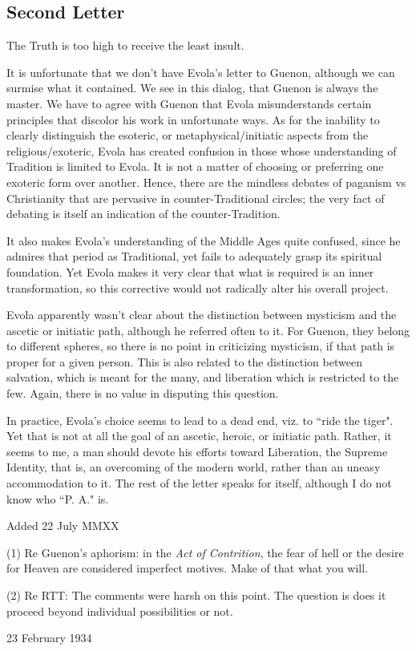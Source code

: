 \subsection{Second Letter}

The Truth is too high to receive the least insult.

\begin{quotex}
It is unfortunate that we don't have Evola's letter to Guenon, although we can surmise what it contained. We see in this dialog, that Guenon is always the master. We have to agree with Guenon that Evola misunderstands certain principles that discolor his work in unfortunate ways. As for the inability to clearly distinguish the esoteric, or metaphysical/initiatic aspects from the religious/exoteric, Evola has created confusion in those whose understanding of Tradition is limited to Evola. It is not a matter of choosing or preferring one exoteric form over another. Hence, there are the mindless debates of paganism vs Christianity that are pervasive in counter-Traditional circles; the very fact of debating is itself an indication of the counter-Tradition.

It also makes Evola's understanding of the Middle Ages quite confused, since he admires that period as Traditional, yet fails to adequately grasp its spiritual foundation. Yet Evola makes it very clear that what is required is an inner transformation, so this corrective would not radically alter his overall project.

Evola apparently wasn't clear about the distinction between mysticism and the ascetic or initiatic path, although he referred often to it. For Guenon, they belong to different spheres, so there is no point in criticizing mysticism, if that path is proper for a given person. This is also related to the distinction between salvation, which is meant for the many, and liberation which is restricted to the few. Again, there is no value in disputing this question.

In practice, Evola's choice seems to lead to a dead end, viz. to ``ride the tiger". Yet that is not at all the goal of an ascetic, heroic, or initiatic path. Rather, it seems to me, a man should devote his efforts toward Liberation, the Supreme Identity, that is, an overcoming of the modern world, rather than an uneasy accommodation to it. The rest of the letter speaks for itself, although I do not know who ``P. A." is.

Added 22 July MMXX

(1) Re Guenon's aphorism: in the \emph{Act of Contrition}, the fear of hell or the desire for Heaven are considered imperfect motives. Make of that what you will.

(2) Re RTT: The comments were harsh on this point. The question is does it proceed beyond individual possibilities or not. 

\end{quotex}
23 February 1934

